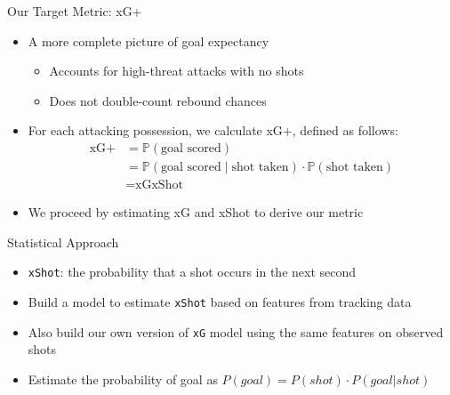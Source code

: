 \documentclass[
  11pt,
  ignorenonframetext,
]{beamer}
\providecommand{\tightlist}{%
  \setlength{\itemsep}{0pt}\setlength{\parskip}{0pt}}
\begin{document}
\begin{frame}{Our Target Metric: xG+}
\protect{}\label{our-target-metric-xg}
\begin{itemize}
\tightlist
\item
  A more complete picture of goal expectancy

  \begin{itemize}
  \tightlist
  \item
    Accounts for high-threat attacks with no shots
  \item
    Does not double-count rebound chances
  \end{itemize}
\item
  For each attacking possession, we calculate xG+, defined as follows:
  \begin{align*}
  \text{xG+} &= \mathbb{P}(\text{goal scored}) \\
  &= \mathbb{P}(\text{goal scored} \mid \text{shot taken})\cdot\mathbb{P}(\text{shot taken}) \\
  &= \text{xG}\text{xShot}
  \end{align*}
\item
  We proceed by estimating xG and xShot to derive our metric
\end{itemize}
\end{frame}

\begin{frame}[fragile]{Statistical Approach}
\protect{}\label{statistical-approach}
\begin{itemize}
\tightlist
\item
  \texttt{xShot}: the probability that a shot occurs in the next second
\item
  Build a model to estimate \texttt{xShot} based on features from
  tracking data
\item
  Also build our own version of \texttt{xG} model using the same
  features on observed shots
\item
  Estimate the probability of goal as
  \(P(goal) = P(shot) \cdot P(goal | shot)\)
\end{itemize}
\end{frame}
\end{document}
